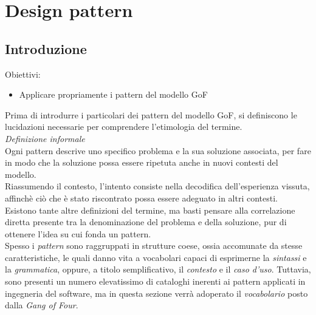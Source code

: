 \documentclass{article}
\begin{document}
\pagestyle{empty}
\section*{Design pattern}
\large

\subsection*{Introduzione}
\large
Obiettivi:
\begin{itemize}
    \renewcommand{\labelitemi}{-}
    \itemsep0em
    \item Applicare propriamente i pattern del modello GoF 
\end{itemize}
Prima di introdurre i particolari dei pattern del modello GoF, si definiscono le lucidazioni necessarie per comprendere l'etimologia del termine.\vspace*{14pt}\\
\textit{Definizione informale}\\
Ogni pattern descrive uno specifico problema e la sua soluzione associata, per fare in modo che la soluzione possa essere ripetuta anche in nuovi contesti del modello.\vspace*{14pt}\\
Riassumendo il contesto, l'intento consiste nella decodifica dell'esperienza vissuta, affinchè ciò che è stato riscontrato possa essere adeguato in altri contesti. Esistono tante altre definizioni del termine, ma basti pensare alla correlazione diretta presente tra la denominazione del problema e della soluzione, pur di ottenere l'idea su cui fonda un pattern.\vspace*{14pt}\\
Spesso i \textit{pattern} sono raggruppati in strutture coese, ossia accomunate da stesse caratteristiche, le quali danno vita a vocabolari capaci di esprimerne la \textit{sintassi} e la \textit{grammatica}, oppure, a titolo semplificativo, il \textit{contesto} e il \textit{caso d'uso}. Tuttavia, sono presenti un numero elevatissimo di cataloghi inerenti ai pattern applicati in ingegneria del software, ma in questa sezione verrà adoperato il \textit{vocabolario} posto dalla \textit{Gang of Four}.
\end{document}

